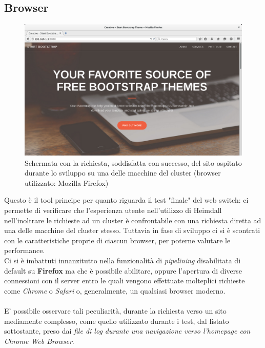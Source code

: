 \documentclass[italian]{tktltiki2}
\begin{document}
\subsection{Browser}
\begin{figure}[h]
\centering
\includegraphics[width=\textwidth]{images/screen_browser}
\caption{Schermata con la richiesta, soddisfatta con successo, del sito ospitato durante lo sviluppo su una delle macchine del cluster (browser utilizzato: Mozilla Firefox)}
\end{figure}
Questo è il tool principe per quanto riguarda il test "finale" del web switch: ci permette di verificare che l'esperienza utente nell'utilizzo di Heimdall nell'inoltrare le richieste ad un cluster è confrontabile con una richiesta diretta ad una delle macchine del cluster stesso. Tuttavia in fase di sviluppo ci si è scontrati con le caratteristiche proprie di ciascun browser, per poterne valutare le performance. \\
Ci si è imbattuti innanzitutto nella funzionalità di \emph{pipelining} disabilitata di default su \textbf{Firefox}\cite{firefox} ma che è possibile abilitare, oppure l'apertura di diverse connessioni con il server entro le quali vengono effettuate molteplici richieste come \emph{Chrome}\cite{chrome} o \emph{Safari}\cite{apple} o, generalmente, un qualsiasi browser moderno. \\\\
E' possibile osservare tali peculiarità, durante la richiesta verso un sito mediamente complesso, come quello utilizzato durante i test, dal listato sottostante, preso dai \emph{file di log durante una navigazione verso l'homepage con Chrome Web Browser}.
\end{document}
